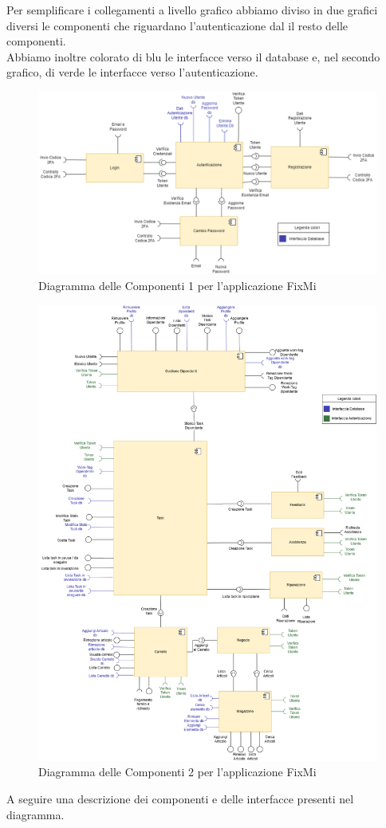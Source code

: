 \documentclass{report}
\begin{document}
Per semplificare i collegamenti a livello grafico abbiamo diviso in due grafici diversi le componenti che riguardano l'autenticazione dal il resto delle componenti.\\
Abbiamo inoltre colorato di blu le interfacce verso il database e, nel secondo grafico,  di verde le interfacce verso l'autenticazione.
\begin{figure}[H]
	\centering\includegraphics[width=1\textwidth]{images/autenticazione_diagramma_dei_componenti.png}
	Diagramma delle Componenti 1 per l'applicazione FixMi
\end{figure}

\begin{figure}[H]
	\centering\includegraphics[width=1\textwidth]{images/diagramma_dei_componenti.png}
	Diagramma delle Componenti 2 per l'applicazione FixMi
\end{figure}
A seguire una descrizione dei componenti e delle interfacce presenti nel diagramma.
\end{document}
